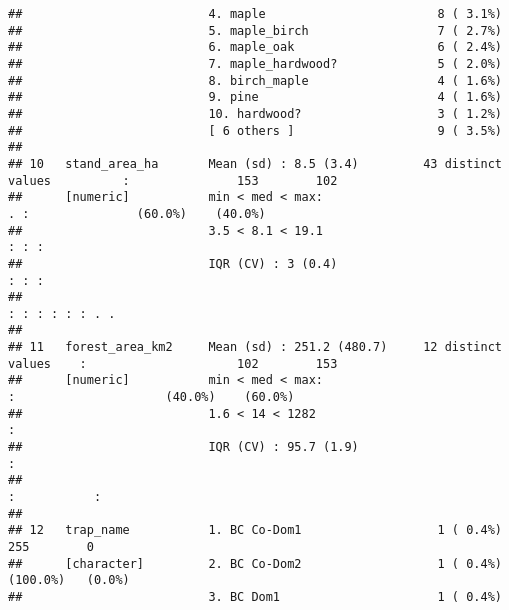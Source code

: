 \documentclass[
]{article}
\begin{document}
\begin{verbatim}
##                          4. maple                        8 ( 3.1%)                                                      
##                          5. maple_birch                  7 ( 2.7%)                                                      
##                          6. maple_oak                    6 ( 2.4%)                                                      
##                          7. maple_hardwood?              5 ( 2.0%)                                                      
##                          8. birch_maple                  4 ( 1.6%)                                                      
##                          9. pine                         4 ( 1.6%)                                                      
##                          10. hardwood?                   3 ( 1.2%)                                                      
##                          [ 6 others ]                    9 ( 3.5%)                                                      
## 
## 10   stand_area_ha       Mean (sd) : 8.5 (3.4)         43 distinct values          :               153        102       
##      [numeric]           min < med < max:                                        . :               (60.0%)    (40.0%)   
##                          3.5 < 8.1 < 19.1                                      : : :                                    
##                          IQR (CV) : 3 (0.4)                                    : : :                                    
##                                                                              : : : : : : . .                            
## 
## 11   forest_area_km2     Mean (sd) : 251.2 (480.7)     12 distinct values    :                     102        153       
##      [numeric]           min < med < max:                                    :                     (40.0%)    (60.0%)   
##                          1.6 < 14 < 1282                                     :                                          
##                          IQR (CV) : 95.7 (1.9)                               :                                          
##                                                                              :           :                              
## 
## 12   trap_name           1. BC Co-Dom1                   1 ( 0.4%)                                 255        0         
##      [character]         2. BC Co-Dom2                   1 ( 0.4%)                                 (100.0%)   (0.0%)    
##                          3. BC Dom1                      1 ( 0.4%)                                                      

\end{verbatim}
\end{document}
